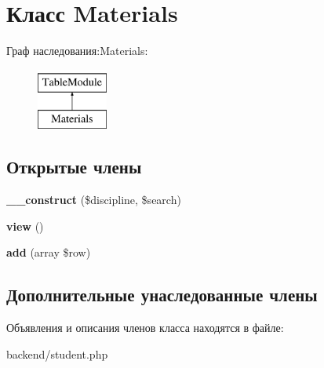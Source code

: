 \hypertarget{classMaterials}{}\section{Класс Materials}
\label{classMaterials}
Граф наследования\+:Materials\+:\begin{figure}[H]
\begin{center}
\leavevmode
\includegraphics[height=2.000000cm]{classMaterials}
\end{center}
\end{figure}
\subsection*{Открытые члены}
\begin{DoxyCompactItemize}
\item 
\hypertarget{classMaterials_af3fb9f614af27713d7ea69ae5f64ba85}{}{\bfseries \+\_\+\+\_\+construct} (\$discipline, \$search)\label{classMaterials_af3fb9f614af27713d7ea69ae5f64ba85}

\item 
\hypertarget{classMaterials_a1ab137318da4a6c06cd5ae098a471906}{}{\bfseries view} ()\label{classMaterials_a1ab137318da4a6c06cd5ae098a471906}

\item 
\hypertarget{classMaterials_ac1d9d2cfe2a07432695703004c43e55b}{}{\bfseries add} (array \$row)\label{classMaterials_ac1d9d2cfe2a07432695703004c43e55b}

\end{DoxyCompactItemize}
\subsection*{Дополнительные унаследованные члены}


Объявления и описания членов класса находятся в файле\+:\begin{DoxyCompactItemize}
\item 
backend/student.\+php\end{DoxyCompactItemize}
